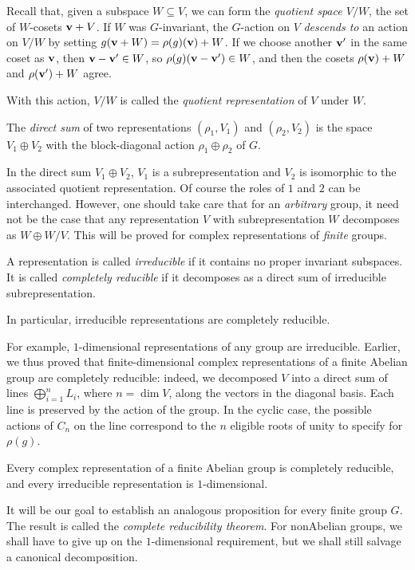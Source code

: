 Recall that, given a subspace \(W\subseteq V\), we can form the
\emph{quotient space \(V/W\)}, the set of \(W\)-cosets \(\mathbf{v}+V\). If \(W\)
was \(G\)-invariant, the \(G\)-action on \(V\) \emph{descends to} an action
on \(V/W\) by setting \(g(\mathbf{v}+W)=\rho(g)(\mathbf{v})+W\). If we choose another
\(\mathbf{v}'\) in the same coset as \(\mathbf{v}\), then \(\mathbf{v}-\mathbf{v}'\in W\), so
\(\rho(g)(\mathbf{v}-\mathbf{v}')\in W\), and then the cosets \(\rho(\mathbf{v})+W\) and
\(\rho(\mathbf{v}')+W\) agree.

\begin{definition}
  With this action, \(V/W\) is called the \emph{quotient representation} of
  \(V\) under \(W\).
\end{definition}

\begin{definition}
  The \emph{direct sum} of two representations \((\rho_1,V_1)\) and
  \((\rho_2,V_2)\) is the space \(V_1\oplus V_2\) with the block-diagonal
  action \(\rho_1\oplus\rho_2\) of \(G\).
\end{definition}

In the direct sum \(V_1\oplus V_2\), \(V_1\) is a subrepresentation and
\(V_2\) is isomorphic to the associated quotient representation. Of course
the roles of \(1\) and \(2\) can be interchanged. However, one should take
care that for an \emph{arbitrary} group, it need not be the case that any
representation \(V\) with subrepresentation \(W\) decomposes as
\(W\oplus W/V\). This will be proved for complex representations of
\emph{finite} groups.

\begin{definition}
  A representation is called \emph{irreducible} if it contains no proper
  invariant subspaces. It is called \emph{completely reducible} if it
  decomposes as a direct sum of irreducible subrepresentation.
\end{definition}

In particular, irreducible representations are completely reducible.

For example, \(1\)-dimensional representations of any group are
irreducible. Earlier, we thus proved that finite-dimensional complex
representations of a finite Abelian group are completely reducible: indeed,
we decomposed \(V\) into a direct sum of lines \(\bigoplus_{i=1}^nL_i\),
where \(n=\dim V\), along the vectors in the diagonal basis. Each line is
preserved by the action of the group. In the cyclic case, the possible
actions of \(C_n\) on the line correspond to the \(n\) eligible roots of
unity to specify for \(\rho(g)\).

\begin{proposition}
  Every complex representation of a finite Abelian group is completely
  reducible, and every irreducible representation is \(1\)-dimensional.
\end{proposition}

It will be our goal to establish an analogous proposition for every finite
group \(G\). The result is called the \emph{complete reducibility
  theorem}. For nonAbelian groups, we shall have to give up on the
\(1\)-dimensional requirement, but we shall still salvage a canonical
decomposition.

